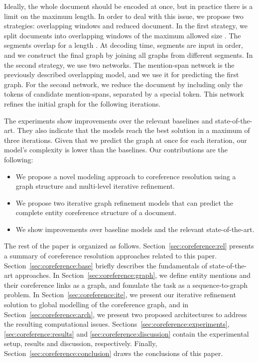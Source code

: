 \documentclass[11pt]{article}
\begin{document}
Ideally, the whole document should be encoded at once, but in practice there is a limit on the maximum length. In order to deal with this issue, we propose two strategies: overlapping windows and reduced document. In the first strategy, we split documents into overlapping windows of the maximum allowed size . The segments overlap for a length . At decoding time, segments are input in order, and we construct the final graph by joining all graphs from different segments. In the second strategy, we use two networks. The mention-span network is the previously described overlapping model, and we use it for predicting the first graph. For the second network, we reduce the document by including only the tokens of candidate mention-spans, separated by a special token. This network refines the initial graph for the following iterations. 

The experiments show improvements over the relevant baselines and state-of-the-art.  They also indicate that the models reach the best solution in a maximum of three iterations.  Given that we predict the graph at once for each iteration, our model's complexity is lower than the baselines. 
Our contributions are the following:
\begin{itemize}
\addtolength{\itemsep}{-0.5ex}
	\item We propose a novel modeling approach to coreference resolution using a graph structure and multi-level iterative refinement.
	\item We propose two iterative graph refinement models that can predict the complete entity coreference structure of a document. 
	\item We show improvements over baseline models and the relevant state-of-the-art.
\end{itemize}


The rest of the paper is organized as follows. Section~\ref{sec:coreference:rel} presents a summary of coreference resolution approaches related to this paper.
Section~\ref{sec:coreference:base} briefly describes the fundamentals of state-of-the-art approaches. In Section~\ref{sec:coreference:graph}, we define entity mentions and their coreference links as a graph, and fomulate the task as a sequence-to-graph problem. In Section~\ref{sec:coreference:ite}, we present our iterative refinement solution to global modelling of the coreference graph, and in Section~\ref{sec:coreference:arch}, we present two proposed architectures to address the resulting computational issues. Sections~\ref{sec:coreference:experiments}, \ref{sec:coreference:results} and \ref{sec:coreference:discussion} contain the experimental setup, results and discussion, respectively. Finally, Section~\ref{sec:coreference:conclusion} draws the conclusions of this paper.
\end{document}
